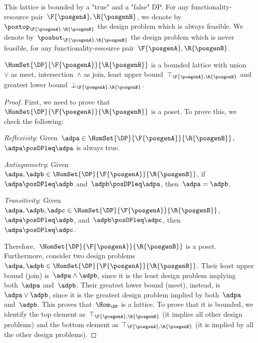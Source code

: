 This lattice is bounded by a "true" and a "false" DP.
For any functionality-resource pair~$\F{\posgenA},\R{\posgenB}$, we denote by~$\postop_{\F{\posgenA},\R{\posgenB}}$ the design problem which is always feasible.
We denote by~$\posbot_{\F{\posgenA},\R{\posgenB}}$ the design problem which is never feasible, for any functionality-resource pair~$\F{\posgenA},\R{\posgenB}$.

\begin{lemma}
    \label{lem:dpboundedlattice}
    $\HomSet{\DP}{\F{\posgenA}}{\R{\posgenB}}$ is a bounded lattice with union~$\vee$ as meet, intersection~$\wedge$ as join, least upper bound~$\top_{\F{\posgenA},\R{\posgenB}}$ and greatest lower bound~$\bot_{\F{\posgenA},\R{\posgenB}}$.
\end{lemma}

\begin{proof}
    First, we need to prove that~$\HomSet{\DP}{\F{\posgenA}}{\R{\posgenB}}$ is a poset. To prove this, we check the following:
% 
    \begin{compactitem}
        \item \emph{Reflexivity}: Given~$\adpa\in \HomSet{\DP}{\F{\posgenA}}{\R{\posgenB}}$,~$\adpa\posDPleq \adpa$ is always true.
        \item \emph{Antisymmetry}: Given~$\adpa,\adpb\in \HomSet{\DP}{\F{\posgenA}}{\R{\posgenB}}$, if~$\adpa\posDPleq \adpb$ and~$\adpb\posDPleq \adpa$, then~$\adpa=\adpb$.
        \item \emph{Transitivity}: Given~$\adpa,\adpb,\adpc\in \HomSet{\DP}{\F{\posgenA}}{\R{\posgenB}}$,~$\adpa\posDPleq \adpb$, and~$\adpb\posDPleq \adpc$, then~$\adpa\posDPleq \adpc$.
    \end{compactitem}
    Therefore,~$\HomSet{\DP}{\F{\posgenA}}{\R{\posgenB}}$ is a poset.
    Furthermore, consider two design problems~$\adpa,\adpb\in \HomSet{\DP}{\F{\posgenA}}{\R{\posgenB}}$.
    Their least upper bound (join) is~$\adpa\wedge \adpb$, since it is the least design problem implying both~$\adpa$ and~$\adpb$.
    Their greatest lower bound (meet), instead, is~$\adpa\vee \adpb$, since it is the greatest design problem implied by both~$\adpa$ and~$\adpb$.
    This proves that~$\Hom_\DP$ is a lattice.
    To prove that it is bounded, we identify the top element as~$\top_{\F{\posgenA},\R{\posgenB}}$ (it implies all other design problems) and the bottom element as~$\top_{\F{\posgenA},\R{\posgenB}}$ (it is implied by all the other design problems).
\end{proof}

